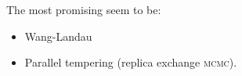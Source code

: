 \documentclass[../notebook.tex]{subfiles}
\begin{document}

The most promising seem to be:

\begin{itemize}
  \item Wang-Landau
  \item Parallel tempering (replica exchange \textsc{mcmc}).
\end{itemize}


\end{document}
